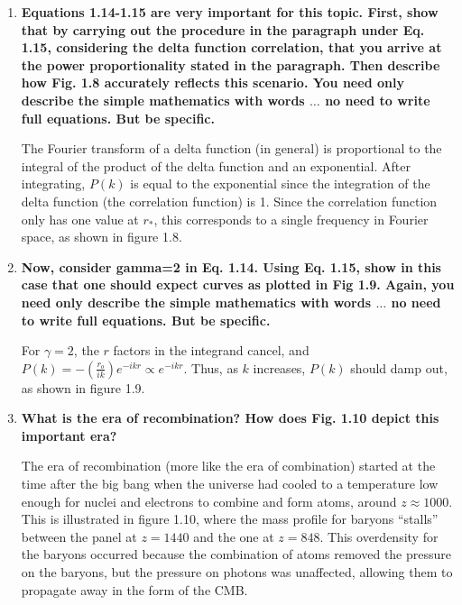\documentclass[11pt]{article}
\begin{document}
\begin{enumerate}
    \item \textbf{Equations 1.14-1.15 are very important for this
    topic. First, show that by carrying out the procedure in the
    paragraph under Eq. 1.15, considering the delta function
    correlation, that you arrive at the power proportionality stated
    in the paragraph. Then describe how Fig. 1.8 accurately reflects
    this scenario. You need only describe the simple mathematics with
    words $\ldots$ no need to write full equations. But be specific.}
    
    The Fourier transform of a delta function (in general) is
    proportional to the integral of the product of the delta function
    and an exponential. After integrating, $P(k)$ is equal to the
    exponential since the integration of the delta function (the
    correlation function) is 1. Since the correlation function only
    has one value at $r_{*}$, this corresponds to a single frequency
    in Fourier space, as shown in figure 1.8.

    \item \textbf{Now, consider gamma=2 in Eq. 1.14. Using Eq. 1.15,
    show in this case that one should expect curves as plotted in Fig
    1.9. Again, you need only describe the simple mathematics with
    words $\ldots$ no need to write full equations. But be specific.}

    For $\gamma = 2$, the $r$ factors in the integrand cancel, and
    $P(k) = -\left(\frac{r_{o}}{ik}\right)e^{-ikr} \propto e^{-ikr}$.
    Thus, as $k$ increases, $P(k)$ should
    damp out, as shown in figure 1.9.

    \item \textbf{What is the era of recombination? How does Fig. 1.10
    depict this important era?}

    The era of recombination (more like the era of combination)
    started at the time after the big bang when the universe had
    cooled to a temperature low enough for nuclei and electrons
    to combine and form atoms, around $z \approx 1000$.
    This is illustrated in figure 1.10, where
    the mass profile for baryons ``stalls'' between the panel at
    $z = 1440$ and the one at $z = 848$. This overdensity for the
    baryons occurred because the combination of atoms removed the
    pressure on the baryons, but the pressure on photons was unaffected,
    allowing them to propagate away in the form of the CMB.



\end{enumerate}
\end{document}
